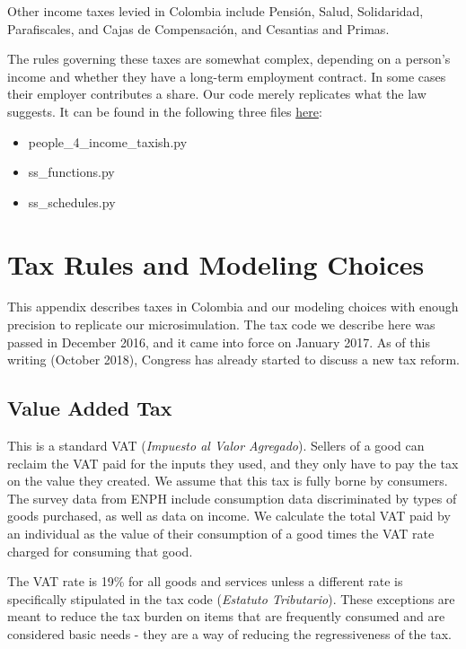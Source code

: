 \documentclass[12pt]{article}
\begin{document}
\begin{appendices}
Other income taxes levied in Colombia include Pensión, Salud, Solidaridad, Parafiscales, and Cajas de Compensación, and Cesantias and Primas.

The rules governing these taxes are somewhat complex,
depending on a person's income and whether they have a long-term employment contract.
In some cases their employer contributes a share.
Our code merely replicates what the law suggests.
It can be found in the following three files \href{https://github.com/ofiscal/tax.co/tree/master/python/build}{here}:
\begin{itemize}
\item people\_4\_income\_taxish.py
\item ss\_functions.py
\item ss\_schedules.py
\end{itemize}


\section{Tax Rules and Modeling Choices}
This appendix describes taxes in Colombia and our modeling choices with enough precision to replicate our microsimulation.
The tax code we describe here was passed in December 2016, and it came into force on January 2017.
As of this writing (October 2018), Congress has already started to discuss a new tax reform.

\subsection{Value Added Tax}
This is a standard VAT (\textit{Impuesto al Valor Agregado}).
Sellers of a good can reclaim the VAT paid for the inputs they used, and they only have to pay the tax on the value they created.
We assume that this tax is fully borne by consumers.
The survey data from ENPH include consumption data discriminated by types of goods purchased, as well as data on income.
We calculate the total VAT paid by an individual as the value of their consumption of a good times the VAT rate charged for consuming that good.

The VAT rate is 19\% for all goods and services unless a different rate is specifically stipulated in the tax code (\textit{Estatuto Tributario}).
These exceptions are meant to reduce the tax burden on items that are frequently consumed and are considered basic needs - they are a way of reducing the regressiveness of the tax.


\end{appendices}
\end{document}

